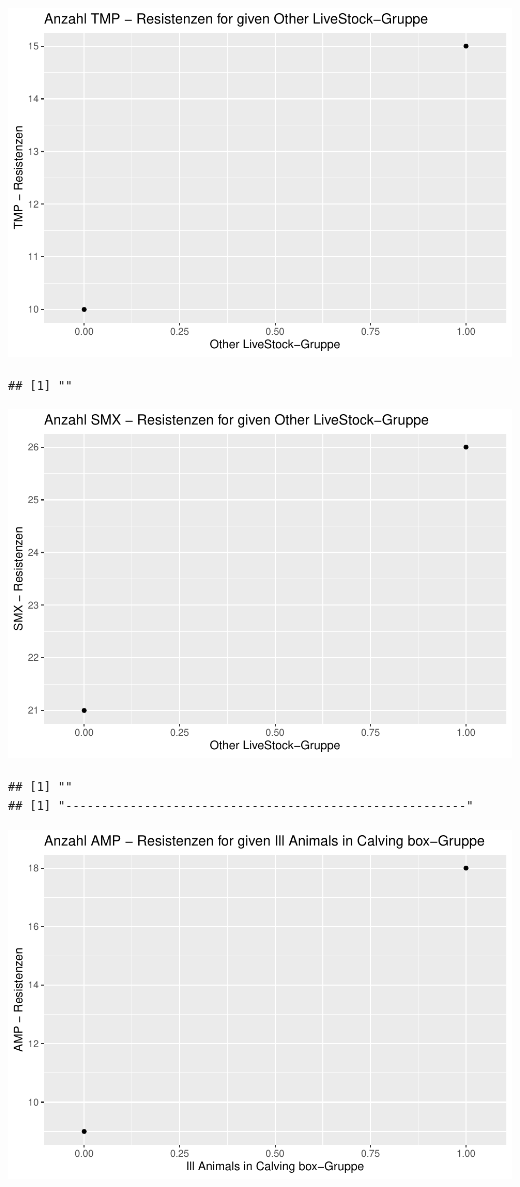 \documentclass[
]{article}
\begin{document}
\includegraphics{NResistenzen_files/figure-latex/binary_or_nominal_variables-19.pdf}

\begin{verbatim}
## [1] ""
\end{verbatim}

\includegraphics{NResistenzen_files/figure-latex/binary_or_nominal_variables-20.pdf}

\begin{verbatim}
## [1] ""
## [1] "--------------------------------------------------------"
\end{verbatim}

\includegraphics{NResistenzen_files/figure-latex/binary_or_nominal_variables-21.pdf}
\end{document}
